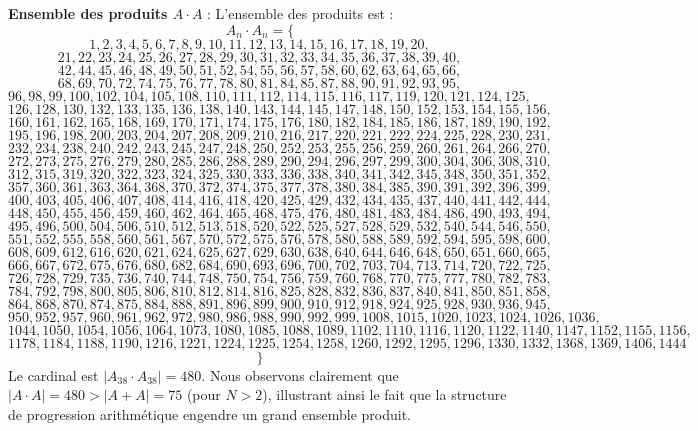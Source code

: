 \documentclass[11pt,a4paper]{article}
\begin{document}
\textbf{Ensemble des produits $A \cdot A$} :
L'ensemble des produits est :
$$ A_{{{n}}} \cdot A_{{{n}}} = \{ $$$$ 1, 2, 3, 4, 5, 6, 7, 8, 9, 10, 11, 12, 13, 14, 15, 16, 17, 18, 19, 20, $$$$ 21, 22, 23, 24, 25, 26, 27, 28, 29, 30, 31, 32, 33, 34, 35, 36, 37, 38, 39, 40, $$$$ 42, 44, 45, 46, 48, 49, 50, 51, 52, 54, 55, 56, 57, 58, 60, 62, 63, 64, 65, 66, $$$$ 68, 69, 70, 72, 74, 75, 76, 77, 78, 80, 81, 84, 85, 87, 88, 90, 91, 92, 93, 95, $$$$ 96, 98, 99, 100, 102, 104, 105, 108, 110, 111, 112, 114, 115, 116, 117, 119, 120, 121, 124, 125, $$$$ 126, 128, 130, 132, 133, 135, 136, 138, 140, 143, 144, 145, 147, 148, 150, 152, 153, 154, 155, 156, $$$$ 160, 161, 162, 165, 168, 169, 170, 171, 174, 175, 176, 180, 182, 184, 185, 186, 187, 189, 190, 192, $$$$ 195, 196, 198, 200, 203, 204, 207, 208, 209, 210, 216, 217, 220, 221, 222, 224, 225, 228, 230, 231, $$$$ 232, 234, 238, 240, 242, 243, 245, 247, 248, 250, 252, 253, 255, 256, 259, 260, 261, 264, 266, 270, $$$$ 272, 273, 275, 276, 279, 280, 285, 286, 288, 289, 290, 294, 296, 297, 299, 300, 304, 306, 308, 310, $$$$ 312, 315, 319, 320, 322, 323, 324, 325, 330, 333, 336, 338, 340, 341, 342, 345, 348, 350, 351, 352, $$$$ 357, 360, 361, 363, 364, 368, 370, 372, 374, 375, 377, 378, 380, 384, 385, 390, 391, 392, 396, 399, $$$$ 400, 403, 405, 406, 407, 408, 414, 416, 418, 420, 425, 429, 432, 434, 435, 437, 440, 441, 442, 444, $$$$ 448, 450, 455, 456, 459, 460, 462, 464, 465, 468, 475, 476, 480, 481, 483, 484, 486, 490, 493, 494, $$$$ 495, 496, 500, 504, 506, 510, 512, 513, 518, 520, 522, 525, 527, 528, 529, 532, 540, 544, 546, 550, $$$$ 551, 552, 555, 558, 560, 561, 567, 570, 572, 575, 576, 578, 580, 588, 589, 592, 594, 595, 598, 600, $$$$ 608, 609, 612, 616, 620, 621, 624, 625, 627, 629, 630, 638, 640, 644, 646, 648, 650, 651, 660, 665, $$$$ 666, 667, 672, 675, 676, 680, 682, 684, 690, 693, 696, 700, 702, 703, 704, 713, 714, 720, 722, 725, $$$$ 726, 728, 729, 735, 736, 740, 744, 748, 750, 754, 756, 759, 760, 768, 770, 775, 777, 780, 782, 783, $$$$ 784, 792, 798, 800, 805, 806, 810, 812, 814, 816, 825, 828, 832, 836, 837, 840, 841, 850, 851, 858, $$$$ 864, 868, 870, 874, 875, 884, 888, 891, 896, 899, 900, 910, 912, 918, 924, 925, 928, 930, 936, 945, $$$$ 950, 952, 957, 960, 961, 962, 972, 980, 986, 988, 990, 992, 999, 1008, 1015, 1020, 1023, 1024, 1026, 1036, $$$$ 1044, 1050, 1054, 1056, 1064, 1073, 1080, 1085, 1088, 1089, 1102, 1110, 1116, 1120, 1122, 1140, 1147, 1152, 1155, 1156, $$$$ 1178, 1184, 1188, 1190, 1216, 1221, 1224, 1225, 1254, 1258, 1260, 1292, 1295, 1296, 1330, 1332, 1368, 1369, 1406, 1444 $$$$ \} $$
Le cardinal est $|A_{38} \cdot A_{38}| = 480$.
Nous observons clairement que $|A \cdot A| = 480 > |A+A| = 75$ (pour $N > 2$), illustrant ainsi le fait que la structure de progression arithmétique engendre un grand ensemble produit.
\newpage
\end{document}
